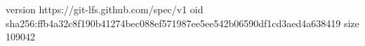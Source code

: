 version https://git-lfs.github.com/spec/v1
oid sha256:ffb4a32c8f190b41274bec088ef571987ee5ee542b06590df1cd3aed4a638419
size 109042
